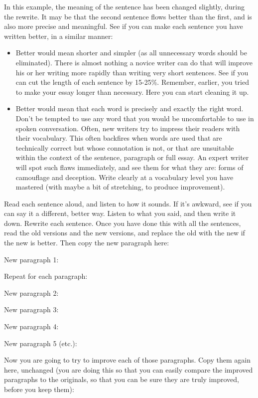 \documentclass{article}
\begin{document}
In this example, the meaning of the sentence has been changed slightly,
during the rewrite. It may be that the second sentence flows better than
the first, and is also more precise and meaningful. See if you can make
each sentence you have written better, in a similar manner:

\begin{itemize}
\item Better would mean shorter and simpler (as all unnecessary words should be
  eliminated). There is almost nothing a novice writer can do that will improve
  his or her writing more rapidly than writing very short sentences. See if you
  can cut the length of each sentence by 15-25\%. Remember, earlier, you tried
  to make your essay longer than necessary. Here you can start cleaning it up.

\item Better would mean that each word is precisely and exactly the right word.
  Don't be tempted to use any word that you would be uncomfortable to use in
  spoken conversation. Often, new writers try to impress their readers with
  their vocabulary. This often backfires when words are used that are
  technically correct but whose connotation is not, or that are unsuitable
  within the context of the sentence, paragraph or full essay. An expert writer
  will spot such flaws immediately, and see them for what they are: forms of
  camouflage and deception. Write clearly at a vocabulary level you have
  mastered (with maybe a bit of stretching, to produce improvement).
\end{itemize}

Read each sentence aloud, and listen to how it sounds. If it's awkward,
see if you can say it a different, better way. Listen to what you said,
and then write it down. Rewrite each sentence. Once you have done this
with all the sentences, read the old versions and the new versions, and
replace the old with the new if the new is better. Then copy the new
paragraph here:

New paragraph 1:

Repeat for each paragraph:

New paragraph 2:

New paragraph 3:

New paragraph 4:

New paragraph 5 (etc.):

Now you are going to try to improve each of those paragraphs. Copy them
again here, unchanged (you are doing this so that you can easily compare
the improved paragraphs to the originals, so that you can be sure they
are truly improved, before you keep them):
\end{document}
